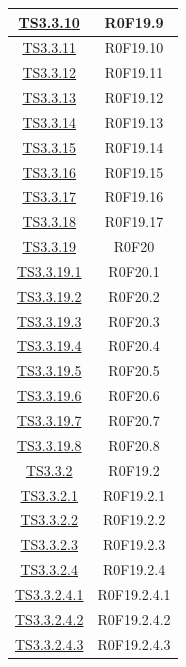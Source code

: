 \documentclass[../PianoDiQualifica.tex]{subfiles}
\begin{document}
\begin{longtable}{|c|c|}
		\hyperlink{TS3.3.10}{TS3.3.10} & R0F19.9   \\
		\hline
		\hyperlink{TS3.3.11}{TS3.3.11} & R0F19.10   \\
		\hline
		\hyperlink{TS3.3.12}{TS3.3.12} & R0F19.11   \\
		\hline
		\hyperlink{TS3.3.13}{TS3.3.13} & R0F19.12   \\
		\hline
		\hyperlink{TS3.3.14}{TS3.3.14} & R0F19.13   \\
		\hline
		\hyperlink{TS3.3.15}{TS3.3.15} & R0F19.14   \\
		\hline
		\hyperlink{TS3.3.16}{TS3.3.16} & R0F19.15   \\
		\hline
		\hyperlink{TS3.3.17}{TS3.3.17} & R0F19.16   \\
		\hline
		\hyperlink{TS3.3.18}{TS3.3.18} & R0F19.17   \\
		\hline
		\hyperlink{TS3.3.19}{TS3.3.19} & R0F20   \\
		\hline
		\hyperlink{TS3.3.19.1}{TS3.3.19.1} & R0F20.1   \\
		\hline
		\hyperlink{TS3.3.19.2}{TS3.3.19.2} & R0F20.2   \\
		\hline
		\hyperlink{TS3.3.19.3}{TS3.3.19.3} & R0F20.3   \\
		\hline
		\hyperlink{TS3.3.19.4}{TS3.3.19.4} & R0F20.4   \\
		\hline
		\hyperlink{TS3.3.19.5}{TS3.3.19.5} & R0F20.5   \\
		\hline
		\hyperlink{TS3.3.19.6}{TS3.3.19.6} & R0F20.6   \\
		\hline
		\hyperlink{TS3.3.19.7}{TS3.3.19.7} & R0F20.7   \\
		\hline
		\hyperlink{TS3.3.19.8}{TS3.3.19.8} & R0F20.8   \\
		\hline
		\hyperlink{TS3.3.2}{TS3.3.2} & R0F19.2   \\
		\hline
		\hyperlink{TS3.3.2.1}{TS3.3.2.1} & R0F19.2.1   \\
		\hline
		\hyperlink{TS3.3.2.2}{TS3.3.2.2} & R0F19.2.2   \\
		\hline
		\hyperlink{TS3.3.2.3}{TS3.3.2.3} & R0F19.2.3   \\
		\hline
		\hyperlink{TS3.3.2.4}{TS3.3.2.4} & R0F19.2.4   \\
		\hline
		\hyperlink{TS3.3.2.4.1}{TS3.3.2.4.1} & R0F19.2.4.1   \\
		\hline
		\hyperlink{TS3.3.2.4.2}{TS3.3.2.4.2} & R0F19.2.4.2   \\
		\hline
		\hyperlink{TS3.3.2.4.3}{TS3.3.2.4.3} & R0F19.2.4.3   \\
		\hline

\end{longtable}
\end{document}
